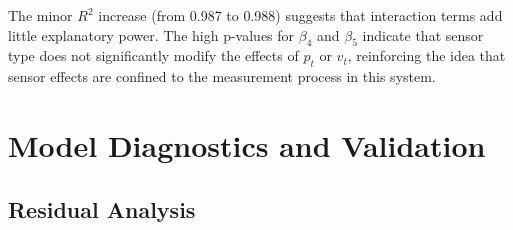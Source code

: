 \documentclass[12pt]{article}
\begin{document}
The minor \( R^2 \) increase (from 0.987 to 0.988) suggests that interaction terms add little explanatory power. The high p-values for \( \beta_4 \) and \( \beta_5 \) indicate that sensor type does not significantly modify the effects of \( p_t \) or \( v_t \), reinforcing the idea that sensor effects are confined to the measurement process in this system.

\section{Model Diagnostics and Validation}
\label{sec:diagnostics}

\subsection{Residual Analysis}
\label{subsec:residual_analysis}
\end{document}

